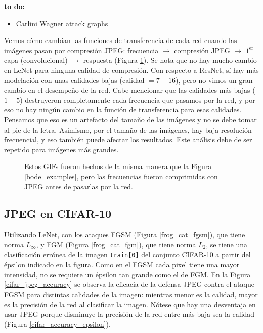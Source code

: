 {\LARGE \textbf{to do:}}
\begin{itemize}
    \item Carlini Wagner attack graphs
\end{itemize}

Vemos cómo cambian las funciones de transferencia de cada red cuando las imágenes pasan por compresión JPEG: frecuencia $\to$ compresión JPEG $\to$ $1^\text{er}$ capa (convolucional) $\to$ respuesta (Figura \ref{bode_gifs}). Se nota que no hay mucho cambio en LeNet para ninguna calidad de compresión. Con respecto a ResNet, sí hay más modelación con unas calidades bajas (calidad $= 7-16$), pero no vimos un gran cambio en el desempeño de la red. Cabe mencionar que las calidades más bajas ($1-5$) destruyeron completamente cada frecuencia que pasamos por la red, y por eso no hay ningún cambio en la función de transferencia para esas calidades. Pensamos que eso es un artefacto del tamaño de las imágenes y no se debe tomar al pie de la letra. Asimismo, por el tamaño de las imágenes, hay baja resolución frecuencial, y eso también puede afectar los resultados. Este análisis debe de ser repetido para imágenes más grandes.
\begin{figure}[h]
    \caption{Estos GIFs fueron hechos de la misma manera que la Figura \ref{bode_examples}, pero las frecuencias fueron comprimidas con JPEG antes de pasarlas por la red.}
    \label{bode_gifs}
\end{figure}

\subsection{JPEG en CIFAR-10}

Utilizando LeNet, con los ataques FGSM (Figura \ref{frog_cat_fgsm}), que tiene norma $L_\infty$, y FGM (Figura \ref{frog_cat_fgm}), que tiene norma $L_2$, se tiene una clasificación errónea de la imagen \texttt{train[0]} del conjunto CIFAR-10 a partir del épsilon indicado en la figura. Como en el FGSM cada pixel tiene una mayor intensidad, no se requiere un épsilon tan grande como el de FGM. En la Figura \ref{cifar_jpeg_accuracy} se observa la eficacia de la defensa JPEG contra el ataque FGSM para distintas calidades de la imagen: mientras menor es la calidad, mayor es la precisión de la red al clasificar la imagen. Nótese que hay una desventaja en usar JPEG porque disminuye la precisión de la red entre más baja sea la calidad (Figura \ref{cifar_accuracy_epsilon}).




